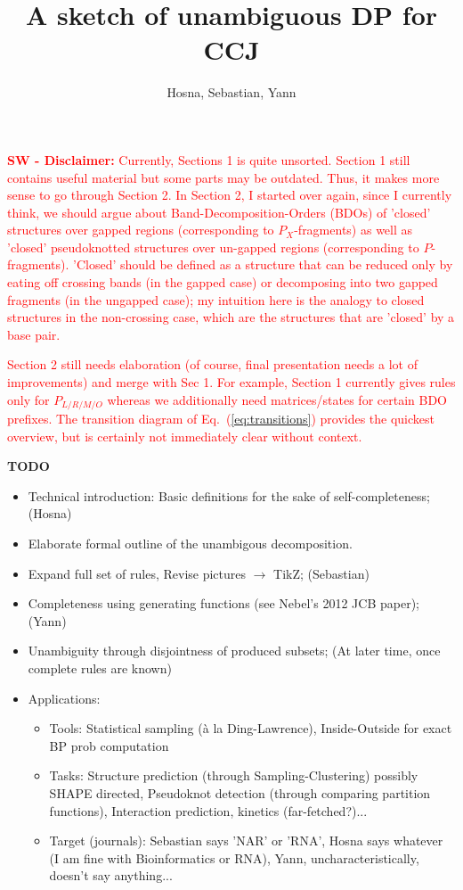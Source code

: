 \documentclass[11pt]{article} %
\title{A sketch of unambiguous DP for CCJ}
\author{Hosna, Sebastian, Yann}
\begin{document}
\maketitle

\textcolor{red}{\textbf{SW - Disclaimer:} Currently, Sections 1 is quite unsorted. Section 1 still contains useful material but some parts may be outdated. Thus, it makes more sense to go through Section 2. In Section 2, I started over again, since I currently think, we should argue about Band-Decomposition-Orders (BDOs) of 'closed' structures over gapped regions (corresponding to $P_X$-fragments) as well as 'closed' pseudoknotted structures over un-gapped regions (corresponding to $P$-fragments). 'Closed' should be defined as a structure that can be reduced only by eating off crossing bands (in the gapped case) or decomposing into two gapped fragments (in the ungapped case); my intuition here is the analogy to closed structures in the non-crossing case, which are the structures that are 'closed' by a base pair.}

\textcolor{red}{%
Section 2 still needs elaboration (of course, final presentation needs a lot of improvements) and merge with Sec 1. For example, Section 1 currently gives rules only for $P_{L/R/M/O}$ whereas we additionally need matrices/states for certain BDO prefixes. The transition diagram of Eq.~(\ref{eq:transitions}) provides the quickest overview, but is certainly not immediately clear without context.}

{\bf TODO}
\begin{itemize}
  \item Technical introduction: Basic definitions for the sake of self-completeness; (Hosna)
  \item Elaborate formal outline of the unambigous decomposition. 
  \item Expand full set of rules, Revise pictures $\to$ TikZ; (Sebastian)
  \item Completeness using generating functions (see Nebel's 2012 JCB paper); (Yann)
  \item Unambiguity through disjointness of produced subsets; (At later time, once complete rules are known)
  \item Applications: 
   \begin{itemize}
    \item Tools: Statistical sampling (à la Ding-Lawrence), Inside-Outside for exact BP prob computation
    \item Tasks: Structure prediction (through Sampling-Clustering) possibly SHAPE directed, Pseudoknot detection (through comparing partition functions), Interaction prediction, kinetics (far-fetched?)...
    \item Target (journals): Sebastian says 'NAR' or 'RNA', Hosna says whatever (I am fine with Bioinformatics or RNA), Yann, uncharacteristically, doesn't say anything...
  \end{itemize}
\end{itemize}
\end{document}
